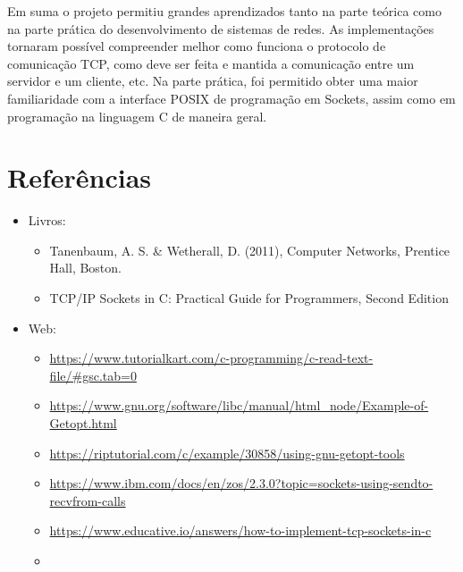 \documentclass{article}
\begin{document}
Em suma o projeto permitiu grandes aprendizados tanto na parte teórica como na
parte prática do desenvolvimento de sistemas de redes. As implementações
tornaram
possível compreender melhor como funciona o protocolo de comunicação TCP, como
deve ser feita e mantida a comunicação entre um servidor e um cliente, etc. Na
parte prática, foi permitido obter uma maior familiaridade
com a interface POSIX de programação em Sockets, assim como em programação na
linguagem C de maneira geral.

\section{Referências}

\begin{itemize}
      \item Livros:
            \begin{itemize}
                  \item Tanenbaum, A. S. \& Wetherall, D. (2011), Computer
                        Networks, Prentice Hall, Boston.
                  \item TCP/IP Sockets in C\@: Practical Guide for Programmers,
                        Second Edition
            \end{itemize}

      \item Web:
            \begin{itemize}
                  \item

                        \url{https://www.tutorialkart.com/c-programming/c-read-text-file/#gsc.tab=0}
                  \item

                        \url{https://www.gnu.org/software/libc/manual/html_node/Example-of-Getopt.html}
                  \item

                        \url{https://riptutorial.com/c/example/30858/using-gnu-getopt-tools}
                  \item

                        \url{https://www.ibm.com/docs/en/zos/2.3.0?topic=sockets-using-sendto-recvfrom-calls}
                  \item

                        \url{https://www.educative.io/answers/how-to-implement-tcp-sockets-in-c}
                  \item


\end{itemize}
\end{itemize}
\end{document}
